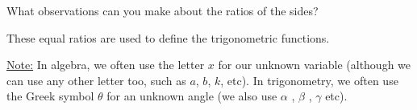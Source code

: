     \par
      \label{m39405*id79075}What observations can you make about the ratios of the sides?\par 
      \label{m39405*id79081}These equal ratios are used to define the trigonometric functions.\par 
      \label{m39405*id79087}\uline{Note:} In algebra, we often use the letter $x$ for our unknown variable (although we can use any other letter too, such as $a$, $b$, $k$, etc). In trigonometry, we often use the Greek symbol $\theta $ for an unknown angle (we also use $\alpha $ , $\beta $ , $\gamma $ etc). \par 
  \label{m39405**end}
%     
%     
%     
    \label{m39408*cid5}
